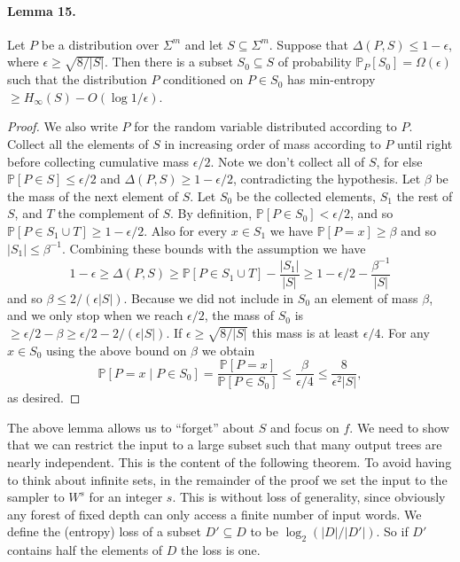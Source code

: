 \documentclass[10pt,a4paper]{article}
\begin{document}
\paragraph{Lemma 15.}
Let $P$ be a distribution over $\Sigma^m$ and let $S\subseteq\Sigma^m$. Suppose that $\Delta(P,S)\leq1-\epsilon$, where $\epsilon\geq\sqrt{8/|S|}$. Then there is a subset $S_0\subseteq S$ of probability $\mathbb P_P[S_0]=\Omega(\epsilon)$ such that the distribution $P$ conditioned on $P\in S_0$ has min-entropy $\geq H_\infty(S)-O(\log1/\epsilon)$.
\begin{proof}
We also write $P$ for the random variable distributed according to $P$. Collect all the elements of $S$ in increasing order of mass according to $P$ until right before collecting cumulative mass $\epsilon/2$. Note we don't collect all of $S$, for else $\mathbb P[P\in S]\leq\epsilon/2$ and $\Delta(P,S)\geq1-\epsilon/2$, contradicting the hypothesis.
Let $\beta$ be the mass of the next element of $S$. Let $S_0$ be the collected elements, $S_1$ the rest of $S$, and $T$ the complement of $S$. By definition, $\mathbb P[P\in S_0]<\epsilon/2$, and so $\mathbb P[P\in S_1\cup T]\geq1-\epsilon/2$. Also for every $x\in S_1$ we have $\mathbb P[P=x]\geq\beta$ and so $|S_1|\leq\beta^{-1}$. Combining these bounds with the assumption we have
\[1-\epsilon\geq\Delta(P,S)\geq\mathbb P[P\in S_1\cup T]-\frac{|S_1|}{|S|}\geq1-\epsilon/2-\frac{\beta^{-1}}{|S|}\]
and so $\beta\leq2/(\epsilon|S|)$.
Because we did not include in $S_0$ an element of mass $\beta$, and we only stop when we reach $\epsilon/2$, the mass of $S_0$ is $\geq\epsilon/2-\beta\geq\epsilon/2-2/(\epsilon|S|)$. If $\epsilon\geq\sqrt{8/|S|}$ this mass is at least $\epsilon/4$.
For any $x\in S_0$ using the above bound on $\beta$ we obtain
\[\mathbb P[P=x\mid P\in S_0]=\frac{\mathbb P[P=x]}{\mathbb P[P\in S_0]}\leq\frac{\beta}{\epsilon/4}\leq\frac8{\epsilon^2|S|},\]
as desired.
\end{proof}
The above lemma allows us to ``forget'' about $S$ and focus on $f$. We need to show that we can restrict the input to a large subset such that many output trees are nearly independent. This is the content of the following theorem. To avoid having to think about infinite sets, in the remainder of the proof we set the input to the sampler to $W^s$ for an integer $s$. This is without loss of generality, since obviously any forest of fixed depth can only access a finite number of input words.
We define the (entropy) loss of a subset $D'\subseteq D$ to be $\log_2(|D|/|D'|)$. So if $D'$ contains half the elements of $D$ the loss is one.
\end{document}

